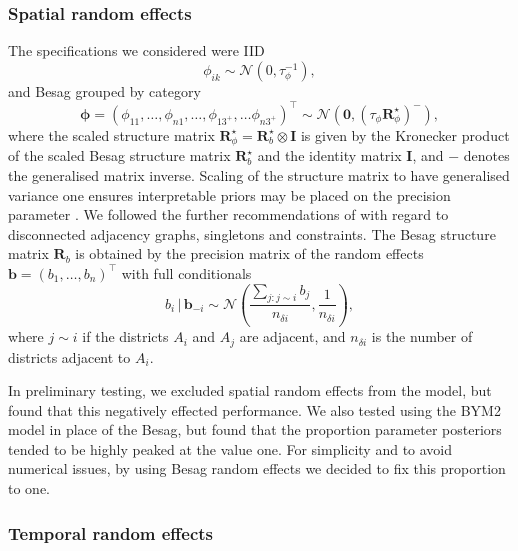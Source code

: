 \documentclass[a4paper, nobind]{templates/ociamthesis}
\newcommand{\N}{\mathcal{N}}
\newcommand{\bphi}{\bm{\phi}}
\begin{document}
\hypertarget{spatial-random-effects-1}{%
\subsubsection{Spatial random effects}\label{spatial-random-effects-1}}

The specifications we considered were IID
\[
\phi_{ik} \sim \mathcal{N}(0, \tau_\phi^{-1}),
\]
and Besag grouped by category
\[
\bphi = (\phi_{11}, \ldots, \phi_{n1}, \ldots, \phi_{1{3^{+}}}, \ldots \phi_{n3^{+}})^\top \sim \mathcal{N}(\mathbf{0}, (\tau_\phi \mathbf{R}^\star_\phi)^{-}),
\]
where the scaled structure matrix \(\mathbf{R}^\star_\phi = \mathbf{R}^\star_b \otimes \mathbf{I}\) is given by the Kronecker product of the scaled Besag structure matrix \(\mathbf{R}^\star_b\) and the identity matrix \(\mathbf{I}\), and \({-}\) denotes the generalised matrix inverse.
Scaling of the structure matrix to have generalised variance one ensures interpretable priors may be placed on the precision parameter \autocite{sorbye2014scaling}.
We followed the further recommendations of \textcite{freni2018note} with regard to disconnected adjacency graphs, singletons and constraints.
The Besag structure matrix \(\mathbf{R}_b\) is obtained by the precision matrix of the random effects \(\mathbf{b} = (b_1, \ldots, b_n)^\top\) with full conditionals
\begin{equation}
b_i \, | \, \mathbf{b}_{-i} \sim \N\left(\frac{\sum_{j: j \sim i} b_j}{n_{\delta i}}, \frac{1}{n_{\delta i}}\right),
\end{equation}
where \(j \sim i\) if the districts \(A_i\) and \(A_j\) are adjacent, and \(n_{\delta i}\) is the number of districts adjacent to \(A_i\).

In preliminary testing, we excluded spatial random effects from the model, but found that this negatively effected performance.
We also tested using the BYM2 model \autocite{simpson2017penalising} in place of the Besag, but found that the proportion parameter posteriors tended to be highly peaked at the value one.
For simplicity and to avoid numerical issues, by using Besag random effects we decided to fix this proportion to one.

\hypertarget{temporal-random-effects}{%
\subsubsection{Temporal random effects}\label{temporal-random-effects}}
\end{document}
